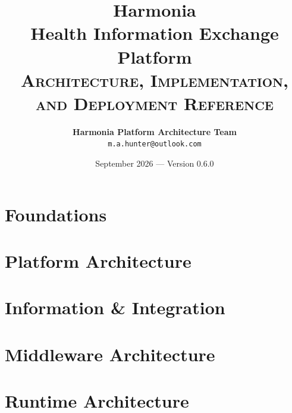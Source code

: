 \documentclass[10pt,a4paper,oneside]{report}
\title{
    \vspace{-2.0cm}
    {\Huge\bfseries\color{harmoniablue} Harmonia}\\[0.4cm]
    {\LARGE\bfseries Health Information Exchange Platform}\\[0.8cm]
    {\large\scshape Architecture, Implementation, and Deployment Reference}
}
\author{
    \textbf{Harmonia Platform Architecture Team}\\
    \texttt{m.a.hunter@outlook.com}
}
\date{September 2026 --- Version 0.6.0}
\begin{document}
\maketitle
\thispagestyle{empty}




\tableofcontents
\newpage
\listoffigures
\newpage
\listoftables
\newpage


\part{Foundations}





\part{Platform Architecture}









\part{Information \& Integration}




\part{Middleware Architecture}






\part{Runtime Architecture}






\end{document}
